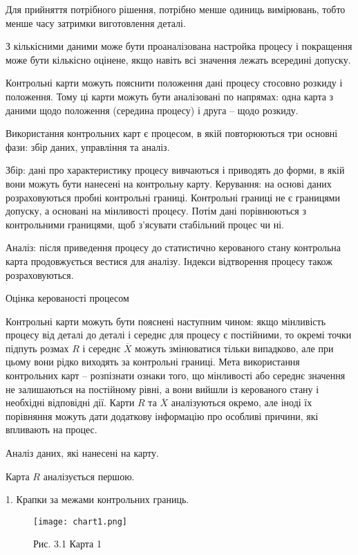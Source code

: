 Для прийняття потрібного рішення, потрібно менше одиниць вимірювань, тобто менше часу затримки виготовлення деталі.

З кількісними даними може бути проаналізована настройка процесу і покращення може бути кількісно оцінене, якщо навіть всі значення лежать всередині допуску.

Контрольні карти можуть пояснити положення дані процесу стосовно розкиду і положення. Тому ці карти можуть бути аналізовані по напрямах: одна карта з даними щодо положення (середина процесу) і друга -- щодо розкиду.

Використання контрольних карт є процесом, в якій повторюються три основні фази: збір даних, управління та аналіз.

Збір: дані про характеристику процесу вивчаються і приводять до форми, в якій вони можуть бути нанесені на контрольну карту.
Керування: на основі даних розраховуються пробні контрольні границі.
Контрольні границі не є границями допуску, а основані на мінливості процесу.
Потім дані порівнюються з контрольними границями, щоб з'ясувати стабільний
процес чи ні.

Аналіз: після приведення процесу до статистично керованого стану
контрольна карта продовжується вестися для аналізу. Індекси відтворення
процесу також розраховуються.

Оцінка керованості процесом

Контрольні карти можуть бути пояснені наступним чином: якщо
мінливість процесу від деталі до деталі і середнє для процесу є постійними, то
окремі точки підпуть розмах $R$ і середнє $\overline{X}$ можуть змінюватися тільки
випадково, але при цьому вони рідко виходять за контрольні границі. Мета
використання контрольних карт – розпізнати ознаки того, що мінливості або
середнє значення не залишаються на постійному рівні, а вони вийшли із
керованого стану і необхідні відповідні дії. Карти $R$ та $\overline{X}$ аналізуються
окремо, але іноді їх порівняння можуть дати додаткову інформацію про
особливі причини, які впливають на процес.

Аналіз даних, які нанесені на карту.

Карта $R$ аналізується першою.

1. Крапки за межами контрольних границь.

\begin{figure}[H]
\centering
\texttt{[image: chart1.png]} %
\caption{Рис. 3.1 Карта 1}
\label{fig:chart1}
\end{figure}

